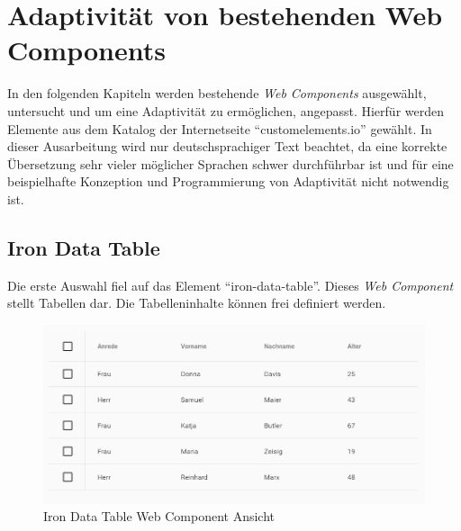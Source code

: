 \documentclass[12pt, paper=a4, bibtotoc, toc=listof, headsepline=true, numbers=endperiod]{scrreprt}
\begin{document}
	
\chapter{Adaptivität von bestehenden Web Components}
	In den folgenden Kapiteln werden bestehende \emph{Web Components} ausgewählt, untersucht und um eine Adaptivität zu ermöglichen, angepasst. Hierfür werden Elemente aus dem Katalog der Internetseite \enquote{customelements.io} gewählt\cite{cusEleIo}. In dieser Ausarbeitung wird nur deutschsprachiger Text beachtet, da eine korrekte Übersetzung sehr vieler möglicher Sprachen schwer durchführbar ist und für eine beispielhafte Konzeption und Programmierung von Adaptivität nicht notwendig ist.
	\section{Iron Data Table}
	Die erste Auswahl fiel auf das Element \enquote{iron-data-table}\cite{saulis}. Dieses \emph{Web Component} stellt Tabellen dar. Die Tabelleninhalte können frei definiert werden.
	\begin{figure}[H]		
		\centering
		\includegraphics[width=\textwidth,height=\textheight,keepaspectratio]{datTab.png}
		\caption[Iron Data Table]{Iron Data Table Web Component Ansicht}
		\label{img:datTab}
	\end{figure}
\end{document}
